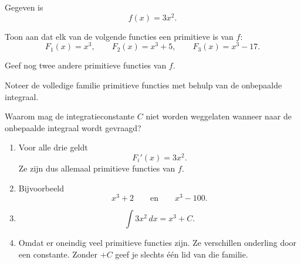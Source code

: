 \documentclass{ximera}
\begin{document}

\begin{oefening}{\oefB\ESS}

Gegeven is
\[
f(x)=3x^2.
\]

\begin{question}
Toon aan dat elk van de volgende functies een primitieve is van $f$:
\[
F_1(x)=x^3,
\qquad
F_2(x)=x^3+5,
\qquad
F_3(x)=x^3-17.
\]
\end{question}

\begin{question}
Geef nog twee andere primitieve functies van $f$.
\end{question}

\begin{question}
Noteer de volledige familie primitieve functies met behulp van de onbepaalde integraal.
\end{question}

\begin{question}
Waarom mag de integratieconstante $C$ niet worden weggelaten wanneer naar de onbepaalde integraal wordt gevraagd?
\end{question}

\begin{oplossing}

\begin{enumerate}
\item
Voor alle drie geldt
\[
F_i'(x)=3x^2.
\]
Ze zijn dus allemaal primitieve functies van $f$.

\item
Bijvoorbeeld
\[
x^3+2
\qquad\text{en}\qquad
x^3-100.
\]

\item
\[
\boxed{\int 3x^2\,dx=x^3+C.}
\]

\item
Omdat er oneindig veel primitieve functies zijn. Ze verschillen onderling door een constante. Zonder $+C$ geef je slechts één lid van die familie.
\end{enumerate}

\end{oplossing}

\end{oefening}


\end{document}
